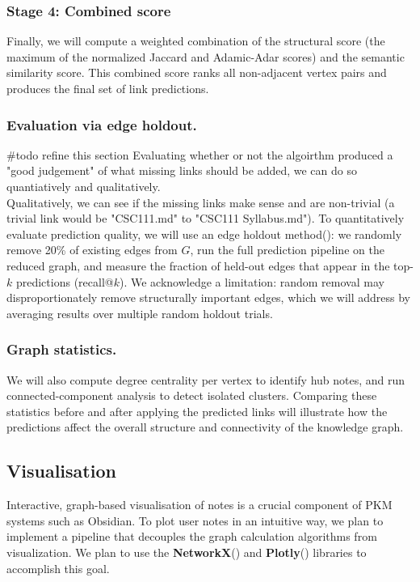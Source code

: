 \documentclass[fontsize=11pt]{article}
\begin{document}
\subsubsection*{Stage 4: Combined score}
Finally, we will compute a weighted combination of the structural score (the maximum of the normalized Jaccard and Adamic-Adar scores) and the semantic similarity score. This combined score ranks all non-adjacent vertex pairs and produces the final set of link predictions.

\subsubsection*{Evaluation via edge holdout.}
\#todo refine this section
Evaluating whether or not the algoirthm produced a "good judgement" of what missing links should be added, we can do so quantiatively and qualitatively. \\

\noindent Qualitatively, we can see if the missing links make sense and are non-trivial (a trivial link would be "CSC111.md" to "CSC111 Syllabus.md"). To quantitatively evaluate prediction quality, we will use an edge holdout method(\cite{gfg_holdout}): we randomly remove 20\% of existing edges from $G$, run the full prediction pipeline on the reduced graph, and measure the fraction of held-out edges that appear in the top-$k$ predictions (recall@$k$). We acknowledge a limitation: random removal may disproportionately remove structurally important edges, which we will address by averaging results over multiple random holdout trials.

\subsubsection*{Graph statistics.}
We will also compute degree centrality per vertex to identify hub notes, and run connected-component analysis to detect isolated clusters. Comparing these statistics before and after applying the predicted links will illustrate how the predictions affect the overall structure and connectivity of the knowledge graph.

\subsection*{Visualisation}

Interactive, graph-based visualisation of notes is a crucial component of PKM systems such as Obsidian. To plot user notes in an intuitive way, we plan to implement a pipeline that decouples the graph calculation algorithms from visualization. We plan to use the \textbf{NetworkX}(\cite{networkx}) and \textbf{Plotly}(\cite{plotly}) libraries to accomplish this goal. 
\end{document}
